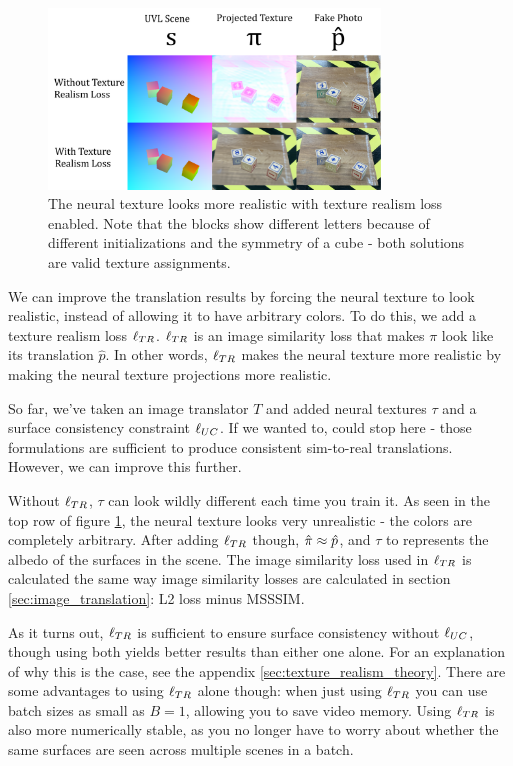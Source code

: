 \documentclass{article}
\begin{document}
\begin{figure}[H]
	\begin{center}
		\includegraphics[width=250pt]{../images/texture_realism_ablation.pdf}
	\end{center}
	\caption{
		The neural texture looks more realistic with texture realism loss enabled. Note that the blocks show different letters because of different initializations and the symmetry of a cube - both solutions are valid texture assignments. 
	}
	\label{fig:texture_realism_ablation}
\end{figure}

We can improve the translation results by forcing the neural texture to look realistic, instead of allowing it to have arbitrary colors.
To do this, we add a texture realism loss $\ell_{TR}$.
$\ell_{TR}$ is an image similarity loss that makes $\pi$ look like its translation $\hat{p}$.
In other words, $\ell_{TR}$ makes the neural texture more realistic by making the neural texture projections more realistic.

So far, we've taken an image translator $T$ and added neural textures $\tau$ and a surface consistency constraint $\ell_{UC}$. 
If we wanted to, could stop here - those formulations are sufficient to produce consistent sim-to-real translations.
However, we can improve this further.

Without $\ell_{TR}$, $\tau$ can look wildly different each time you train it.
As seen in the top row of figure \ref{fig:texture_realism_ablation}, the neural texture looks very unrealistic - the colors are completely arbitrary.
After adding $\ell_{TR}$ though, $\hat{\pi} \approx \hat{p}$, and $\tau$ to represents the albedo of the surfaces in the scene.
The image similarity loss used in $\ell_{TR}$ is calculated the same way image similarity losses are calculated in section \ref{sec:image_translation}: L2 loss minus MSSSIM.

As it turns out, $\ell_{TR}$ is sufficient to ensure surface consistency without $\ell_{UC}$, though using both yields better results than either one alone. 
For an explanation of why this is the case, see the appendix \ref{sec:texture_realism_theory}.
There are some advantages to using $\ell_{TR}$ alone though: when just using $\ell_{TR}$ you can use batch sizes as small as $B=1$, allowing you to save video memory. 
Using $\ell_{TR}$ is also more numerically stable, as you no longer have to worry about whether the same surfaces are seen across multiple scenes in a batch.
\end{document}
